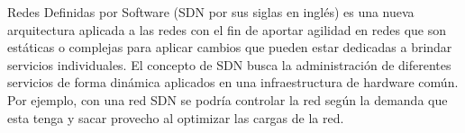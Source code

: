 \documentclass[10pt,journal,compsoc]{IEEEtran}
\begin{document}
%
\IEEEpeerreviewmaketitle







% 
% 
% 
% 
 Redes Definidas por Software (SDN por sus siglas en inglés) es una nueva arquitectura aplicada a las redes con el fin  de aportar agilidad en redes que son estáticas o complejas para aplicar cambios que pueden estar dedicadas a brindar servicios individuales. El concepto de SDN busca la administración de diferentes servicios de forma dinámica aplicados en una infraestructura de hardware común. Por ejemplo, con una red SDN se podría controlar la red según la demanda que esta tenga y sacar provecho al optimizar las cargas de la red.
\end{document}
